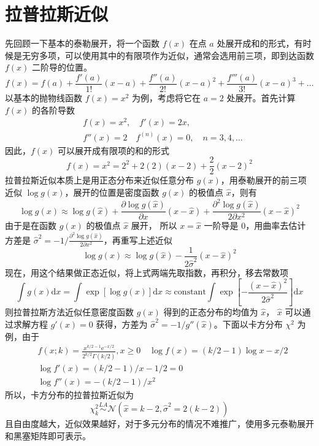 \documentclass[12pt,a4paper,UTF8,twoside]{book}
\theoremstyle{definition}
\theoremstyle{definition}
\theoremstyle{definition}
\theoremstyle{remark}
\begin{document}
\hypertarget{sec:Laplace-approximation}{%
\section{拉普拉斯近似}\label{sec:Laplace-approximation}}

先回顾一下基本的泰勒展开，将一个函数 \(f(x)\) 在点 \(a\) 处展开成和的形式，有时候是无穷多项，可以使用其中的有限项作为近似，通常会选用前三项，即到达函数 \(f(x)\) 二阶导的位置。
\[ f(x) = f(a) + \frac{f'(a)}{1!}(x-a) + \frac{f''(a)}{2!}(x-a)^2 + \frac{f'''(a)}{3!}(x-a)^3 + \ldots \]
\noindent 以基本的抛物线函数 \(f(x) = x^2\) 为例，考虑将它在 \(a = 2\) 处展开。首先计算 \(f(x)\) 的各阶导数
\begin{align*}
   &{} f(x) = x^2, \quad f'(x) = 2x, \\
   &{} f''(x) = 2 \quad f^{(n)}(x) = 0, \quad n = 3,4,\ldots
\end{align*}
\noindent 因此，\(f(x)\) 可以展开成有限项的和的形式
\[ f(x) = x^2 = 2^2 + 2(2)(x-2) + \frac{2}{2}(x-2)^2 \]
拉普拉斯近似本质上是用正态分布来近似任意分布 \(g(x)\)，用泰勒展开的前三项近似 \(\log g(x)\)，展开的位置是密度函数 \(g(x)\) 的极值点 \(\hat{x}\)，则有
\[ \log g(x) \approx \log g(\hat{x}) + \frac{\partial \log g(\hat{x})}{\partial x} (x - \hat{x}) + \frac{\partial^2 \log g(\hat{x})}{2\partial x^2} (x - \hat{x})^2 \]
\noindent 由于是在函数 \(g(x)\) 的极值点 \(\hat{x}\) 展开， 所以 \(x = \hat{x}\) 一阶导是 0，用曲率去估计方差是 \(\hat{\sigma}^2 = -1/\frac{\partial^2 \log g(\hat{x})}{2\partial x^2}\)，再重写上述近似
\[ \log g(x) \approx \log g(\hat{x}) - \frac{1}{2\hat{\sigma}^2} (x - \hat{x})^2 \]
\noindent 现在，用这个结果做正态近似，将上式两端先取指数，再积分，移去常数项
\[ \int g(x) \mathrm{d}x = \int \exp[\log g(x)] \mathrm{d}x \approx \mathrm{constant} \int \exp[- \frac{(x - \hat{x})^2}{2\hat{\sigma}^2}] \mathrm{d}x \]
\noindent 则拉普拉斯方法近似任意密度函数 \(g(x)\) 得到的正态分布的均值为 \(\hat{x}\)， \(\hat{x}\) 可以通过求解方程 \(g'(x) = 0\) 获得，方差为 \(\hat{\sigma}^2 = -1/g''(\hat{x})\)。下面以卡方分布 \(\chi^2\) 为例，由于
\begin{align*}
    &{} f(x; k)     = \frac{ x^{k/2-1} \mathrm{e}^{-x/2} }{ 2^{k/2}\Gamma(k/2) }, x \geq 0 \quad
        \log f(x)   = (k/2 - 1) \log x - x/2 \\
    &{} \log f'(x)  = (k/2-1)/x - 1/2 = 0 \\
    &{} \log f''(x) = -(k/2-1)/x^2
\end{align*}
\noindent 所以，卡方分布的拉普拉斯近似为
\[ \chi_{k}^2 \overset{LA}{\sim}  \mathcal{N}(\hat{x} = k-2, \hat{\sigma}^2 = 2(k-2)) \]
\noindent 且自由度越大，近似效果越好，对于多元分布的情况不难推广，使用多元泰勒展开和黑塞矩阵即可表示\citep{Tierney1986}。
\end{document}
